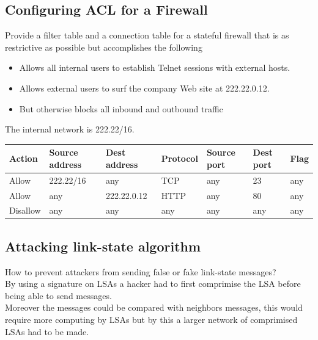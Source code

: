 \documentclass[12pt, a4paper]{article}
\begin{document}
		\subsection{Configuring ACL for a Firewall}
			Provide a filter table and a connection table for a stateful firewall that is as restrictive as possible but accomplishes the following\\
			\begin{itemize}
				\item Allows all internal users to establish Telnet sessions with external hosts.
				\item Allows external users to surf the company Web site at 222.22.0.12.
				\item But otherwise blocks all inbound and outbound traffic
			\end{itemize}
			The internal network is 222.22/16.\\
			\begin{table}[]
			\begin{tabular}{|l|l|l|l|l|l|l|}
			\hline
			\textbf{Action} & \textbf{Source address} & \textbf{Dest address} & \textbf{Protocol} & \textbf{Source port} & \textbf{Dest port} & \textbf{Flag} \\ \hline
			Allow           & 222.22/16               & any                   & TCP               & any                  & 23                 & any               \\ \hline
			Allow           & any                     & 222.22.0.12           & HTTP              & any                  & 80                 & any               \\ \hline
			Disallow        & any                     & any                   & any               & any                  & any                & any               \\ \hline
			\end{tabular}
			\end{table}
		\subsection{Attacking link-state algorithm}
			How to prevent attackers from sending false or fake link-state messages?\\
			By using a signature on LSAs a hacker had to first comprimise the LSA before being able to send messages.\\
			Moreover the messages could be compared with neighbors messages, this would require more computing by LSAs but by this a larger network of comprimised LSAs had to be made.
\end{document}

